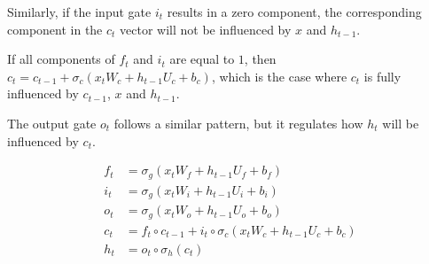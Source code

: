 Similarly, if the input gate $i_t$ results in a zero component, the corresponding component in the $c_t$ vector will not be influenced by $x$ and $h_{t-1}$.

If all components of $f_t$ and $i_t$ are equal to $1$, then $c_t = c_{t-1} + \sigma_c(x_t W_{c} + h_{t-1} U_{c} + b_c)$, which is the case where $c_t$ is fully influenced by $c_{t-1}$, $x$ and $h_{t-1}$.

The output gate $o_t$ follows a similar pattern, but it regulates how $h_t$ will be influenced by $c_t$.

    \begin{align}
\label{eq:lstmequationsstart}     
f_t &= \sigma_g(x_t W_{f} + h_{t-1} U_{f} + b_f) \\
i_t &= \sigma_g(x_t W_{i} + h_{t-1} U_{i} + b_i) \\
o_t &= \sigma_g(x_t W_{o} + h_{t-1} U_{o} + b_o) \\
c_t &= f_t \circ c_{t-1} + i_t \circ \sigma_c(x_t W_{c} + h_{t-1} U_{c} + b_c) \\
\label{eq:lstmequationsend}
h_t &= o_t \circ \sigma_h(c_t)
    \end{align}








